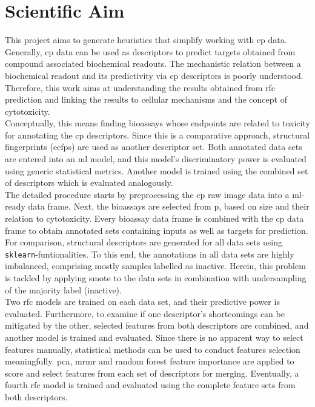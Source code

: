 \chapter{Scientific Aim}\label{sec:scientificaim}
This project aims to generate heuristics that simplify working with \ac{cp} data. Generally, \ac{cp} data can be used as descriptors to predict targets obtained from compound associated biochemical readouts. The mechanistic relation between a biochemical readout and its predictivity via \ac{cp} descriptors is poorly understood. Therefore, this work aims at understanding the results obtained from \ac{rfc} prediction and linking the results to cellular mechanisms and the concept of cytotoxicity.\\
Conceptually, this means finding bioassays whose endpoints are related to toxicity for annotating the \ac{cp} descriptors. Since this is a comparative approach, structural fingerprints (\acp{ecfp}) are used as another descriptor set. Both annotated data sets are entered into an \ac{ml} model, and this model's discriminatory power is evaluated using generic statistical metrics. Another model is trained using the combined set of descriptors which is evaluated analogously.\\
The detailed procedure starts by preprocessing the \ac{cp} raw image data into a \ac{ml}-ready data frame. Next, the bioassays are selected from \acl{p}\cite{Kim2020}, based on size and their relation to cytotoxicity. Every bioassay data frame is combined with the \ac{cp} data frame to obtain annotated sets containing inputs as well as targets for prediction.\\
For comparison, structural descriptors are generated for all data sets using \texttt{sklearn}-funtionalities\cite{Pedregosa2012}. To this end, the annotations in all data sets are highly imbalanced, comprising mostly samples labelled as inactive. Herein, this problem is tackled by applying \ac{smote} to the data sets in combination with undersampling of the majority label (inactive).\\
Two \ac{rfc} models are trained on each data set, and their predictive power is evaluated. Furthermore, to examine if one descriptor's shortcomings can be mitigated by the other, selected features from both descriptors are combined, and another model is trained and evaluated. Since there is no apparent way to select features manually, statistical methods can be used to conduct features selection meaningfully. \ac{pca}, \ac{mrmr} and random forest feature importance are applied to score and select features from each set of descriptors for merging. Eventually, a fourth \ac{rfc} model is trained and evaluated using the complete feature sets from both descriptors.\\
